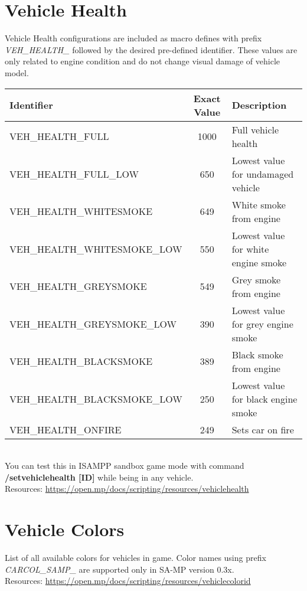 \documentclass{article}
\begin{document}
\newpage
\section{Vehicle Health}
\begin{sloppypar}
Vehicle Health configurations are included as macro defines with prefix \textit{VEH\_HEALTH\_} followed by the desired pre-defined identifier. These values are only related to engine condition and do not change visual damage of vehicle model.
\end{sloppypar}
\bigskip
\noindent\begin{tabular}{ |l|c|l| } 
\hline
Identifier & Exact Value & Description \\
\hline
VEH\_HEALTH\_FULL & 1000 & Full vehicle health \\ 
VEH\_HEALTH\_FULL\_LOW & 650 &  Lowest value for undamaged vehicle \\ 
VEH\_HEALTH\_WHITESMOKE & 649 & White smoke from engine \\ 
VEH\_HEALTH\_WHITESMOKE\_LOW & 550 & Lowest value for white engine smoke \\ 
VEH\_HEALTH\_GREYSMOKE & 549 & Grey smoke from engine \\ 
VEH\_HEALTH\_GREYSMOKE\_LOW & 390 & Lowest value for grey engine smoke\\ 
VEH\_HEALTH\_BLACKSMOKE & 389 & Black smoke from engine \\ 
VEH\_HEALTH\_BLACKSMOKE\_LOW & 250 & Lowest value for black engine smoke \\ 
VEH\_HEALTH\_ONFIRE & 249 & Sets car on fire \\
\hline
\end{tabular}
\bigskip
\\You can test this in ISAMPP sandbox game mode with command \textbf{/setvehiclehealth [ID]} while being in any vehicle.
\bigskip
\\Resources: \url{https://open.mp/docs/scripting/resources/vehiclehealth}


\section{Vehicle Colors}
List of all available colors for vehicles in game. Color names using prefix \textit{CARCOL\_SAMP\_} are supported only in SA-MP version 0.3x.
\bigskip
\\Resources: \url{https://open.mp/docs/scripting/resources/vehiclecolorid}
\end{document}
